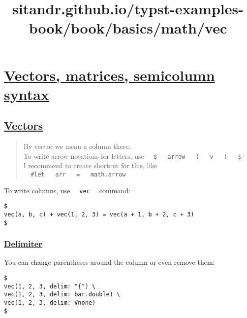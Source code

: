 \title{sitandr.github.io/typst-examples-book/book/basics/math/vec}

\section{\texorpdfstring{\hyperref[vectors-matrices-semicolumn-syntax]{Vectors,
matrices, semicolumn
syntax}}{Vectors, matrices, semicolumn syntax}}\label{vectors-matrices-semicolumn-syntax}

\subsection{\texorpdfstring{\hyperref[vectors]{Vectors}}{Vectors}}\label{vectors}

\begin{quote}
By vector we mean a column there.\\
To write arrow notations for letters, use
\texttt{\ }{\texttt{\ \$\ }}\texttt{\ }{\texttt{\ arrow\ }}\texttt{\ }{\texttt{\ (\ }}\texttt{\ }{\texttt{\ v\ }}\texttt{\ }{\texttt{\ )\ }}\texttt{\ }{\texttt{\ \$\ }}\texttt{\ }\\
I recommend to create shortcut for this, like
\texttt{\ }{\texttt{\ \#let\ }}\texttt{\ }{\texttt{\ arr\ }}\texttt{\ }{\texttt{\ =\ }}\texttt{\ }{\texttt{\ math.arrow\ }}\texttt{\ }
\end{quote}

To write columns, use \texttt{\ }{\texttt{\ vec\ }}\texttt{\ } command:

\begin{verbatim}
$
vec(a, b, c) + vec(1, 2, 3) = vec(a + 1, b + 2, c + 3)
$
\end{verbatim}

\pandocbounded{}

\subsubsection{\texorpdfstring{\hyperref[delimiter]{Delimiter}}{Delimiter}}\label{delimiter}

You can change parentheses around the column or even remove them:

\begin{verbatim}
$
vec(1, 2, 3, delim: "{") \
vec(1, 2, 3, delim: bar.double) \
vec(1, 2, 3, delim: #none)
$
\end{verbatim}

\pandocbounded{}


